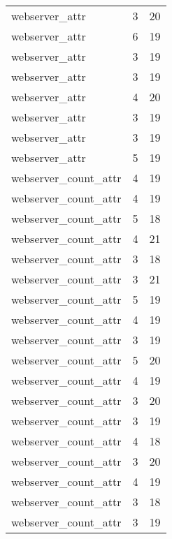 \begin{table}
\begin{tabular}{lrr}
                  webserver\_attr &         3 &        20 \\
                  webserver\_attr &         6 &        19 \\
                  webserver\_attr &         3 &        19 \\
                  webserver\_attr &         3 &        19 \\
                  webserver\_attr &         4 &        20 \\
                  webserver\_attr &         3 &        19 \\
                  webserver\_attr &         3 &        19 \\
                  webserver\_attr &         5 &        19 \\
            webserver\_count\_attr &         4 &        19 \\
            webserver\_count\_attr &         4 &        19 \\
            webserver\_count\_attr &         5 &        18 \\
            webserver\_count\_attr &         4 &        21 \\
            webserver\_count\_attr &         3 &        18 \\
            webserver\_count\_attr &         3 &        21 \\
            webserver\_count\_attr &         5 &        19 \\
            webserver\_count\_attr &         4 &        19 \\
            webserver\_count\_attr &         3 &        19 \\
            webserver\_count\_attr &         5 &        20 \\
            webserver\_count\_attr &         4 &        19 \\
            webserver\_count\_attr &         3 &        20 \\
            webserver\_count\_attr &         3 &        19 \\
            webserver\_count\_attr &         4 &        18 \\
            webserver\_count\_attr &         3 &        20 \\
            webserver\_count\_attr &         4 &        19 \\
            webserver\_count\_attr &         3 &        18 \\
            webserver\_count\_attr &         3 &        19 \\

\end{tabular}
\end{table}
